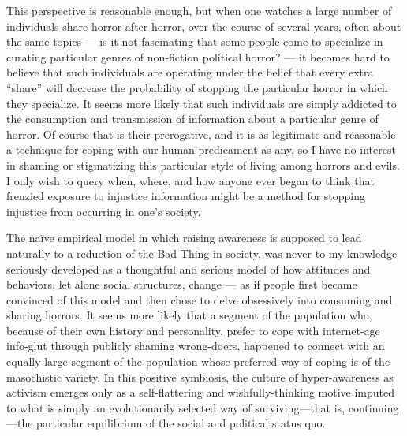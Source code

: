 \documentclass[a4paper,12pt,margin=.5in]{article}
\begin{document}
This perspective is reasonable enough, but when one watches a large
number of individuals share horror after horror, over the course of
several years, often about the same topics --- is it not fascinating
that some people come to specialize in curating particular genres of
non-fiction political horror? --- it becomes hard to believe that such
individuals are operating under the belief that every extra ``share''
will decrease the probability of stopping the particular horror in which
they specialize. It seems more likely that such individuals are simply
addicted to the consumption and transmission of information about a
particular genre of horror. Of course that is their prerogative, and it
is as legitimate and reasonable a technique for coping with our human
predicament as any, so I have no interest in shaming or stigmatizing
this particular style of living among horrors and evils. I only wish to
query when, where, and how anyone ever began to think that frenzied
exposure to injustice information might be a method for stopping
injustice from occurring in one's society.

The naïve empirical model in which raising awareness is supposed to lead
naturally to a reduction of the Bad Thing in society, was never to my
knowledge seriously developed as a thoughtful and serious model of how
attitudes and behaviors, let alone social structures, change --- as if
people first became convinced of this model and then chose to delve
obsessively into consuming and sharing horrors. It seems more likely
that a segment of the population who, because of their own history and
personality, prefer to cope with internet-age info-glut through publicly
shaming wrong-doers, happened to connect with an equally large segment
of the population whose preferred way of coping is of the masochistic
variety. In this positive symbiosis, the culture of hyper-awareness as
activism emerges only as a self-flattering and wishfully-thinking motive
imputed to what is simply an evolutionarily selected way of
surviving---that is, continuing---the particular equilibrium of the
social and political status quo.
\end{document}

